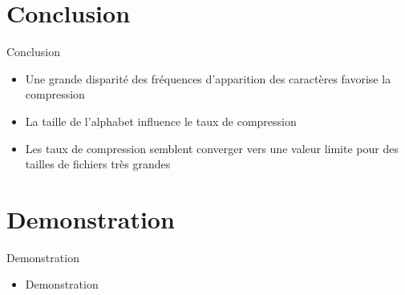 \documentclass{beamer}
\begin{document}
\section{Conclusion}

\begin{frame}{Conclusion}
    \begin{itemize}
        \item Une grande disparité des fréquences d'apparition des caractères favorise la compression
        \item La taille de l'alphabet influence le taux de compression
        \item Les taux de compression semblent converger vers une valeur limite pour des tailles de fichiers très grandes
    \end{itemize}
\end{frame}


\section{Demonstration}
\begin{frame}{Demonstration}
    \begin{itemize}
        \item Demonstration
    \end{itemize}
\end{frame}
\end{document}
